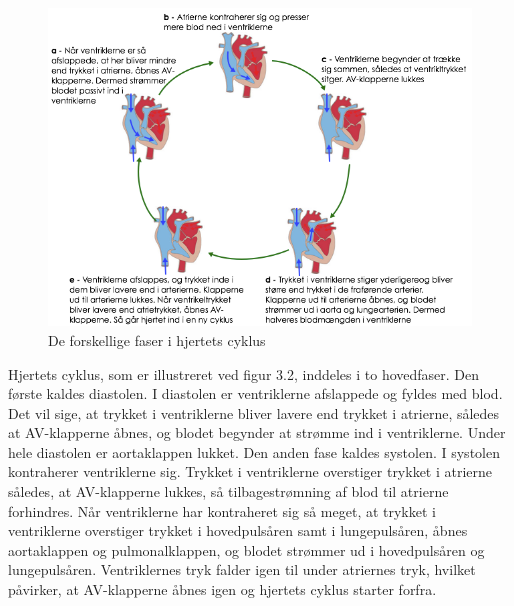 \begin{figure}[htb]
	\centering
	\includegraphics[width=1\textwidth]{Figurer/Fysio/Cyklus}
	\caption{De forskellige faser i hjertets cyklus \protect\cite{cyklus}}
\end{figure}

Hjertets cyklus, som er illustreret ved figur 3.2, inddeles i to hovedfaser. Den første kaldes diastolen. I diastolen er ventriklerne afslappede og fyldes med blod. Det vil sige, at trykket i ventriklerne bliver lavere end trykket i atrierne, således at AV-klapperne åbnes, og blodet begynder at strømme ind i ventriklerne. Under hele diastolen er aortaklappen lukket. Den anden fase kaldes systolen. I systolen kontraherer ventriklerne sig. Trykket i ventriklerne overstiger trykket i atrierne således, at AV-klapperne lukkes, så tilbagestrømning af blod til atrierne forhindres. Når ventriklerne har kontraheret sig så meget, at trykket i ventriklerne overstiger trykket i hovedpulsåren samt i lungepulsåren, åbnes aortaklappen og pulmonalklappen, og blodet strømmer ud i hovedpulsåren og lungepulsåren. Ventriklernes tryk falder igen til under atriernes tryk, hvilket påvirker, at AV-klapperne åbnes igen og hjertets cyklus starter forfra.\\

